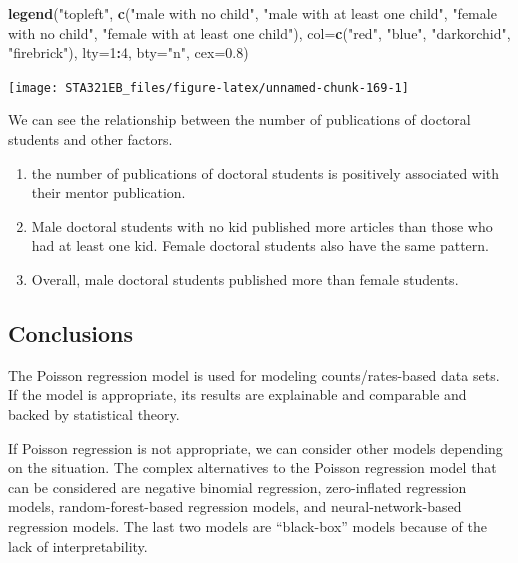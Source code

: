 \documentclass[
]{book}
\newenvironment{Shaded}{\begin{snugshade}}{\end{snugshade}}
\newcommand{\AttributeTok}[1]{\textcolor[rgb]{0.13,0.29,0.53}{#1}}
\newcommand{\DecValTok}[1]{\textcolor[rgb]{0.00,0.00,0.81}{#1}}
\newcommand{\FloatTok}[1]{\textcolor[rgb]{0.00,0.00,0.81}{#1}}
\newcommand{\FunctionTok}[1]{\textcolor[rgb]{0.13,0.29,0.53}{\textbf{#1}}}
\newcommand{\NormalTok}[1]{#1}
\newcommand{\SpecialCharTok}[1]{\textcolor[rgb]{0.81,0.36,0.00}{\textbf{#1}}}
\newcommand{\StringTok}[1]{\textcolor[rgb]{0.31,0.60,0.02}{#1}}
\begin{document}
\begin{Shaded}
\begin{Highlighting}[]
\FunctionTok{legend}\NormalTok{(}\StringTok{"topleft"}\NormalTok{, }\FunctionTok{c}\NormalTok{(}\StringTok{"male with no child"}\NormalTok{, }\StringTok{"male with at least one child"}\NormalTok{, }
                    \StringTok{"female with no child"}\NormalTok{, }\StringTok{"female with at least one child"}\NormalTok{), }
       \AttributeTok{col=}\FunctionTok{c}\NormalTok{(}\StringTok{"red"}\NormalTok{, }\StringTok{"blue"}\NormalTok{, }\StringTok{"darkorchid"}\NormalTok{, }\StringTok{"firebrick"}\NormalTok{),  }\AttributeTok{lty=}\DecValTok{1}\SpecialCharTok{:}\DecValTok{4}\NormalTok{, }\AttributeTok{bty=}\StringTok{"n"}\NormalTok{, }\AttributeTok{cex=}\FloatTok{0.8}\NormalTok{)}
\end{Highlighting}
\end{Shaded}

\begin{center}\texttt{[image: STA321EB\_files/figure-latex/unnamed-chunk-169-1]} \end{center}

We can see the relationship between the number of publications of doctoral students and other factors.

\begin{enumerate}
\def\labelenumi{\arabic{enumi}.}
\item
  the number of publications of doctoral students is positively associated with their mentor publication.
\item
  Male doctoral students with no kid published more articles than those who had at least one kid. Female doctoral students also have the same pattern.
\item
  Overall, male doctoral students published more than female students.
\end{enumerate}

\hypertarget{conclusions}{%
\subsection{Conclusions}\label{conclusions}}

The Poisson regression model is used for modeling counts/rates-based data sets. If the model is appropriate, its results are explainable and comparable and backed by statistical theory.

If Poisson regression is not appropriate, we can consider other models depending on the situation. The complex alternatives to the Poisson regression model that can be considered are negative binomial regression, zero-inflated regression models, random-forest-based regression models, and neural-network-based regression models. The last two models are ``black-box'' models because of the lack of interpretability.
\end{document}
